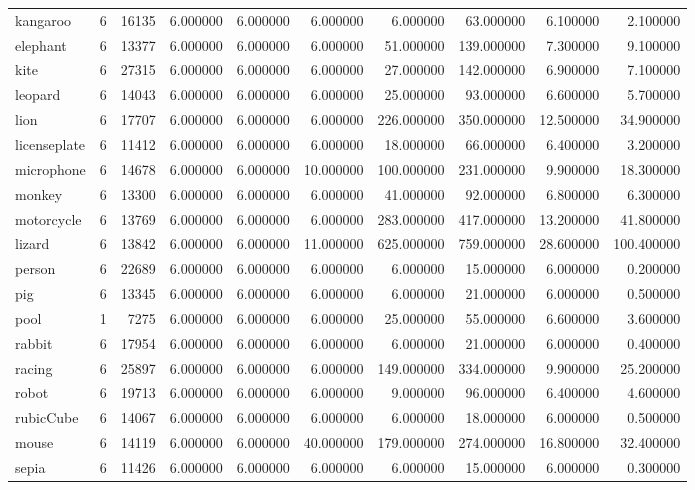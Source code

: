 \begin{tabular}{lrrrrrrrrr}
kangaroo & 6 & 16135 & 6.000000 & 6.000000 & 6.000000 & 6.000000 & 63.000000 & 6.100000 & 2.100000 \\
elephant & 6 & 13377 & 6.000000 & 6.000000 & 6.000000 & 51.000000 & 139.000000 & 7.300000 & 9.100000 \\
kite & 6 & 27315 & 6.000000 & 6.000000 & 6.000000 & 27.000000 & 142.000000 & 6.900000 & 7.100000 \\
leopard & 6 & 14043 & 6.000000 & 6.000000 & 6.000000 & 25.000000 & 93.000000 & 6.600000 & 5.700000 \\
lion & 6 & 17707 & 6.000000 & 6.000000 & 6.000000 & 226.000000 & 350.000000 & 12.500000 & 34.900000 \\
licenseplate & 6 & 11412 & 6.000000 & 6.000000 & 6.000000 & 18.000000 & 66.000000 & 6.400000 & 3.200000 \\
microphone & 6 & 14678 & 6.000000 & 6.000000 & 10.000000 & 100.000000 & 231.000000 & 9.900000 & 18.300000 \\
monkey & 6 & 13300 & 6.000000 & 6.000000 & 6.000000 & 41.000000 & 92.000000 & 6.800000 & 6.300000 \\
motorcycle & 6 & 13769 & 6.000000 & 6.000000 & 6.000000 & 283.000000 & 417.000000 & 13.200000 & 41.800000 \\
lizard & 6 & 13842 & 6.000000 & 6.000000 & 11.000000 & 625.000000 & 759.000000 & 28.600000 & 100.400000 \\
person & 6 & 22689 & 6.000000 & 6.000000 & 6.000000 & 6.000000 & 15.000000 & 6.000000 & 0.200000 \\
pig & 6 & 13345 & 6.000000 & 6.000000 & 6.000000 & 6.000000 & 21.000000 & 6.000000 & 0.500000 \\
pool & 1 & 7275 & 6.000000 & 6.000000 & 6.000000 & 25.000000 & 55.000000 & 6.600000 & 3.600000 \\
rabbit & 6 & 17954 & 6.000000 & 6.000000 & 6.000000 & 6.000000 & 21.000000 & 6.000000 & 0.400000 \\
racing & 6 & 25897 & 6.000000 & 6.000000 & 6.000000 & 149.000000 & 334.000000 & 9.900000 & 25.200000 \\
robot & 6 & 19713 & 6.000000 & 6.000000 & 6.000000 & 9.000000 & 96.000000 & 6.400000 & 4.600000 \\
rubicCube & 6 & 14067 & 6.000000 & 6.000000 & 6.000000 & 6.000000 & 18.000000 & 6.000000 & 0.500000 \\
mouse & 6 & 14119 & 6.000000 & 6.000000 & 40.000000 & 179.000000 & 274.000000 & 16.800000 & 32.400000 \\
sepia & 6 & 11426 & 6.000000 & 6.000000 & 6.000000 & 6.000000 & 15.000000 & 6.000000 & 0.300000 \\

\end{tabular}
